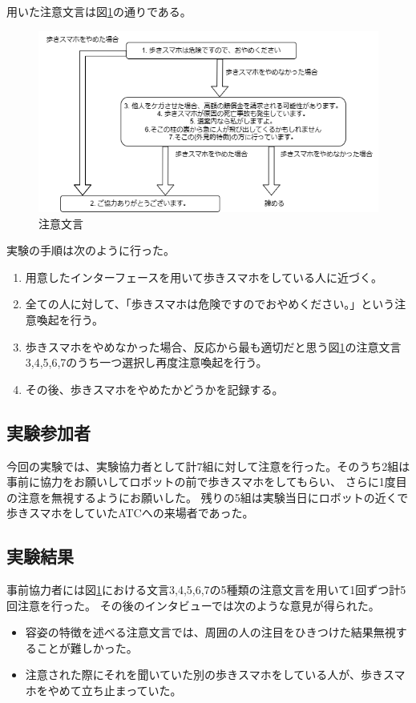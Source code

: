 \documentclass{kuisthesis}
\begin{document}
用いた注意文言は図\ref{fig: Strategy}の通りである。
\begin{figure}[h]
  \includegraphics[width=15cm]{img/waystostop.drawio.png}
  \caption{注意文言}
  \label{fig: Strategy}
\end{figure}
実験の手順は次のように行った。
\begin{enumerate}
  \item 用意したインターフェースを用いて歩きスマホをしている人に近づく。
  \item 全ての人に対して、「歩きスマホは危険ですのでおやめください。」という注意喚起を行う。
  \item 歩きスマホをやめなかった場合、反応から最も適切だと思う図\ref{fig: Strategy}の注意文言3,4,5,6,7のうち一つ選択し再度注意喚起を行う。
  \item その後、歩きスマホをやめたかどうかを記録する。
\end{enumerate}


\subsection{実験参加者}
今回の実験では、実験協力者として計7組に対して注意を行った。そのうち2組は事前に協力をお願いしてロボットの前で歩きスマホをしてもらい、
さらに1度目の注意を無視するようにお願いした。
残りの5組は実験当日にロボットの近くで歩きスマホをしていたATCへの来場者であった。
\subsection{実験結果}
事前協力者には図\ref{fig: Strategy}における文言3,4,5,6,7の5種類の注意文言を用いて1回ずつ計5回注意を行った。
その後のインタビューでは次のような意見が得られた。
\begin{itemize}
  \item 容姿の特徴を述べる注意文言では、周囲の人の注目をひきつけた結果無視することが難しかった。
  \item 注意された際にそれを聞いていた別の歩きスマホをしている人が、歩きスマホをやめて立ち止まっていた。
\end{itemize}
\end{document}
